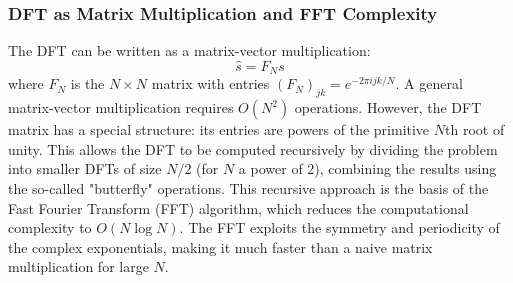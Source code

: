 \subsubsection*{DFT as Matrix Multiplication and FFT Complexity}
The DFT can be written as a matrix-vector multiplication:
\[
    \hat{s} = F_N s
\]
where $F_N$ is the $N \times N$ matrix with entries $(F_N)_{jk} = e^{-2\pi i jk / N}$.
A general matrix-vector multiplication requires $O(N^2)$ operations. However, the DFT matrix has a special structure: its entries are powers of the primitive $N$th root of unity. This allows the DFT to be computed recursively by dividing the problem into smaller DFTs of size $N/2$ (for $N$ a power of $2$), combining the results using the so-called "butterfly" operations.
This recursive approach is the basis of the Fast Fourier Transform (FFT) algorithm, which reduces the computational complexity to $O(N \log N)$. The FFT exploits the symmetry and periodicity of the complex exponentials, making it much faster than a naive matrix multiplication for large $N$.